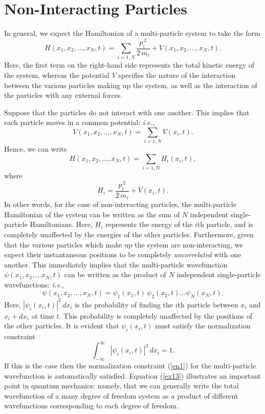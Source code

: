 \section{Non-Interacting Particles}\label{snon}
In general, we expect the Hamiltonian of a multi-particle system to take the form
\begin{equation}\label{ex10}
H(x_1,x_2,\ldots, x_N, t) = \sum_{i=1,N}\frac{p_i^{\,2}}{2\,m_i}
+ V(x_1,x_2,\ldots, x_N, t).
\end{equation}
Here, the first term on the right-hand side represents the total kinetic
energy of the system, whereas the potential $V$ specifies the nature of the interaction between the
various particles making up the system, as well as the interaction of the
particles with any external forces.

 Suppose that the particles do not interact with one another. This
 implies that each particle moves in a common potential: {\em i.e.},
 \begin{equation}
V(x_1,x_2,\ldots, x_N,t) = \sum_{i=1,N} V(x_i,t).
 \end{equation}
  Hence, we can write
 \begin{equation}\label{ex11}
 H(x_1,x_2,\ldots, x_N,t)=\sum_{i=1,N} H_i(x_i,t),
 \end{equation}
 where 
 \begin{equation}\label{ex12}
 H_i = \frac{p_i^{\,2}}{2\,m_i} + V(x_i,t).
 \end{equation}
 In other words, for the case of non-interacting particles, the
 multi-particle Hamiltonian of the system can be written as the
 sum of $N$ independent single-particle Hamiltonians. Here, $H_i$
 represents the energy of the $i$th particle, and is completely
 unaffected by the energies of the other particles.
 Furthermore, given that the various particles which make up the
 system are non-interacting, we expect their instantaneous positions to be completely
 {\em uncorrelated}\/ with one another. This immediately implies that
 the multi-particle wavefunction $\psi(x_1,x_2,\ldots x_N,t)$ can
 be written as the product of $N$ independent single-particle 
 wavefunctions: {\em i.e.}, 
 \begin{equation}\label{ex13}
 \psi(x_1,x_2,\ldots, x_N, t) = \psi_1(x_1,t)\,\psi_2(x_2,t)\ldots\psi_N(x_N,t).
 \end{equation}
 Here, $|\psi_i(x_i,t)|^2\,dx_i$ is the probability of finding the
 $i$th particle between $x_i$ and $x_i+dx_i$ at time $t$. This probability
 is completely unaffected by the positions of the other particles. It
 is evident that $\psi_i(x_i,t)$ must satisfy the normalization constraint
 \begin{equation}
 \int_{-\infty}^\infty |\psi_i(x_i,t)|^2\,dx_i = 1.
 \end{equation}
 If this is the case  then the normalization constraint (\ref{en1}) for the
 multi-particle wavefunction is automatically satisfied.
 Equation (\ref{ex13}) illustrates an important point in quantum mechanics: namely, that we can generally write the total wavefunction of a many degree of freedom system as a product of different wavefunctions corresponding to each degree
 of freedom.
 
